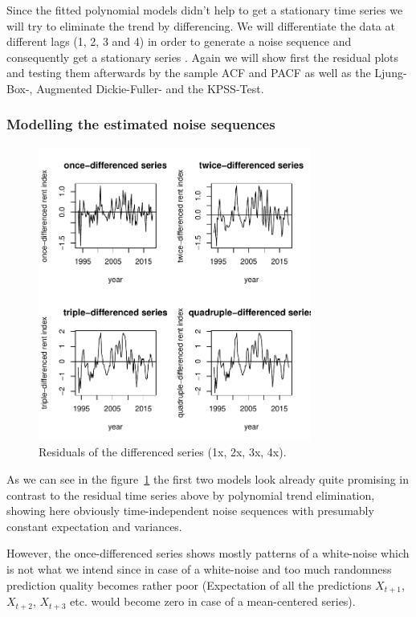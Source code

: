 \documentclass[11pt,a4paper]{article}
\begin{document}
Since the fitted polynomial models didn't help to get a stationary time series we will try to eliminate the trend by differencing.
We will differentiate the data at different lags (1, 2, 3 and 4) in order to generate a noise sequence and consequently get a stationary series \citep[p.~35]{bd02}.
Again we will show first the residual plots and testing them afterwards by the sample ACF and PACF as well as the Ljung-Box-, Augmented Dickie-Fuller- and the KPSS-Test.


\subsubsection{Modelling the estimated noise sequences}

\begin{figure}
    \centering
    \includegraphics[angle=0,width=0.8\textwidth]{resid_diff_all}
    \caption{Residuals of the differenced series (1x, 2x, 3x, 4x).}
    \label{fig:resid_diff_all}
\end{figure}

As we can see in the figure~\ref{fig:resid_diff_all} the first two models look already quite promising in contrast to the residual time series above by polynomial trend elimination, showing here obviously time-independent noise sequences with presumably constant expectation and variances.

However, the once-differenced series shows mostly patterns of a white-noise which is not what we intend since in case of a white-noise and too much randomness prediction quality becomes rather poor (Expectation of all the predictions $X_{t+1}$, $X_{t+2}$, $X_{t+3}$ etc. would become zero in case of a mean-centered series).
\end{document}
